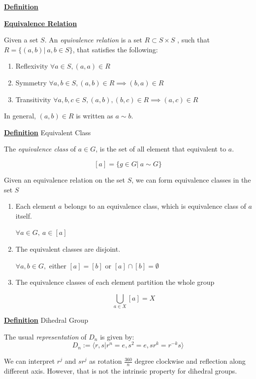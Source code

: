 \documentclass[a4paper, 12pt]{article}
\begin{document}
\textbf{\underline{Definition}}

\vspace{5mm}

\textbf{\underline{Equivalence Relation}}

Given a set $S$. An \textit{equivalence relation} is a set $R\subset S \times S$
, such that $R = \{(a, b)|~ a,b\in S\}$, that satisfies the following:
\begin{enumerate}
    \item Reflexivity $\forall a\in S, (a, a)\in R$
    \item Symmetry $\forall a,b\in S, (a, b)\in R \implies (b, a)\in R$
    \item Transitivity $\forall a, b, c\in S, (a, b), (b, c)\in R \implies 
        (a, c)\in R$
\end{enumerate}

In general, $(a, b)\in R$ is written as $a\sim b$.
\newpage

\textbf{\underline{Definition}} Equivalent Class

The \textit{equivalence class} of $a\in G$, is the set of all element that 
equivalent to $a$.

$$[a] = \{g\in G|~ a\sim G\}$$

Given an equivalence relation on the set $S$, we can form equivalence classes in
the set $S$
\begin{enumerate}
    \item Each element $a$ belongs to an equivalence class, which is equivalence 
        class of $a$ itself.

        $\forall a\in G,~ a\in[a]$
    \item The equivalent classes are disjoint.

        $\forall a, b\in G,$ either $[a] = [b]$ or $[a]\cap [b] = \emptyset$

    \item The equivalence classes of each element partition the whole group

        $$\bigcup _{a\in X} [a] = X$$
\end{enumerate}

\textbf{\underline{Definition}} Dihedral Group

The usual \textit{representation} of $D_n$ is given by:
$$D_n := \langle r,s | r^n = e, s^2 = e, sr^k = r^{-k}s \rangle$$

We can interpret $r^j$ and $sr^j$ as rotation $\frac{360}{n}$ degree clockwise
and reflection along different axis. However, that is not the intrinsic property
for dihedral groups.
\end{document}
